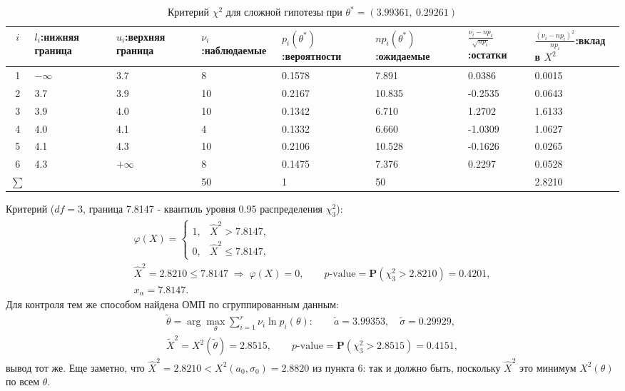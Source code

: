 \documentclass[12pt]{spbstu-task}
\renewcommand{\Prob}{\mathbf{P}}
\begin{document}
\begin{table}[H]
  \caption{Критерий \(\chi^2\) для сложной гипотезы при \(\theta^* = (3.99361,\ 0.29261)\)}
  \centering
  \small
  \setlength{\tabcolsep}{2pt}
  \begin{tabularx}{\textwidth}{c*{7}{Y}}
    \toprule
    \(i\) & \(l_i\):\newline нижняя граница & \(u_i\):\newline верхняя граница & \(\nu_i\):\newline наблюдаемые
    & \(p_i(\theta^*)\):\newline вероятности & \(np_i(\theta^*)\):\newline ожидаемые
    & \(\frac{\nu_i - np_i}{\sqrt{np_i}}\):\newline остатки & \(\frac{(\nu_i - np_i)^2}{np_i}\):\newline вклад в \(X^2\) \\
     & \(-\infty\) & 3.7 & 8 & 0.1578 & 7.891 & 0.0386 & 0.0015 \\
    2 & 3.7 & 3.9 & 10 & 0.2167 & 10.835 & -0.2535 & 0.0643 \\
    3 & 3.9 & 4.0 & 10 & 0.1342 & 6.710 & 1.2702 & 1.6133 \\
    4 & 4.0 & 4.1 & 4 & 0.1332 & 6.660 & -1.0309 & 1.0627 \\
    5 & 4.1 & 4.3 & 10 & 0.2106 & 10.528 & -0.1626 & 0.0265 \\
    6 & 4.3 & \(+\infty\) & 8 & 0.1475 & 7.376 & 0.2297 & 0.0528 \\
    \midrule
    \(\sum\) & & & 50 & 1 & 50 & & 2.8210 \\
    \bottomrule
  \end{tabularx}
\end{table}

Критерий (\(df = 3\), граница 7.8147 - квантиль уровня 0.95 распределения \(\chi^2_3\)):
\begin{gather*}
  \varphi(X) =
  \begin{cases}
    1, & \hat{X}^2 > 7.8147,\\
    0, & \hat{X}^2 \le 7.8147,
  \end{cases}\\
  \hat{X}^2 = 2.8210 \le 7.8147 \;\Rightarrow\; \varphi(X) = 0,\qquad
  p\text{-value} = \Prob\left(\chi^2_3 > 2.8210\right) = 0.4201,\\
  x_\alpha = 7.8147.
\end{gather*}
Для контроля тем же способом найдена ОМП по сгруппированным данным:
\begin{gather*}
  \tilde{\theta} = \arg\max_\theta\sum_{i=1}^{r}\nu_i\ln p_i(\theta):\qquad
  \tilde{a} = 3.99353,\quad \tilde{\sigma} = 0.29929,\\
  \tilde{X}^2 = X^2(\tilde{\theta}) = 2.8515,\qquad p\text{-value} = \Prob\left(\chi^2_3 > 2.8515\right) = 0.4151,
\end{gather*}
вывод тот же. Еще заметно, что \(\hat{X}^2 = 2.8210 < X^2(a_0, \sigma_0) = 2.8820\) из пункта 6:
так и должно быть, поскольку \(\hat{X}^2\) это минимум \(X^2(\theta)\) по всем \(\theta\).
\end{document}
